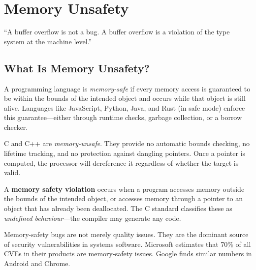 \chapter{Memory Unsafety}
\label{ch:memory-unsafety}

\epigraph{``A buffer overflow is not a bug. A buffer overflow is a violation of the type system at the machine level.''}{}


\section{What Is Memory Unsafety?}

A programming language is \emph{memory-safe} if every memory access is guaranteed to be within the bounds of the intended object and occurs while that object is still alive. Languages like JavaScript, Python, Java, and Rust (in safe mode) enforce this guarantee---either through runtime checks, garbage collection, or a borrow checker.

C and C++ are \emph{memory-unsafe}. They provide no automatic bounds checking, no lifetime tracking, and no protection against dangling pointers. Once a pointer is computed, the processor will dereference it regardless of whether the target is valid.

\begin{definition}
	A \textbf{memory safety violation} occurs when a program accesses memory outside the bounds of the intended object, or accesses memory through a pointer to an object that has already been deallocated. The C standard classifies these as \emph{undefined behaviour}---the compiler may generate any code.
\end{definition}

Memory-safety bugs are not merely quality issues. They are the dominant source of security vulnerabilities in systems software. Microsoft estimates that 70\% of all CVEs in their products are memory-safety issues. Google finds similar numbers in Android and Chrome.

